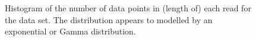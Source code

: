 \begin{figure}
	\centering

\caption{\label{fig:n-hist}Histogram of the number of data points in (length of) each read for the data set. The distribution appears to modelled by an exponential or Gamma distribution.}
\end{figure}

